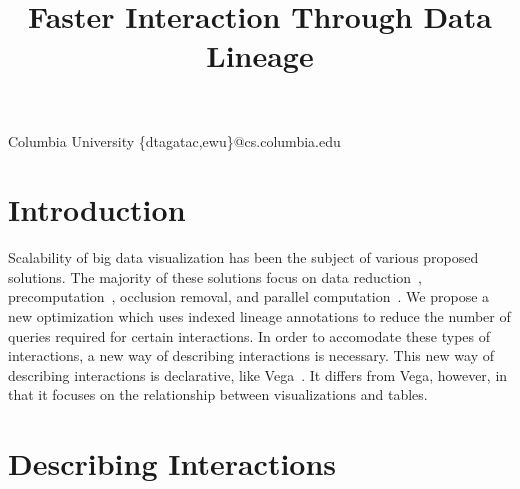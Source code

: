 \documentclass[fleqn]{sigplanconf}
\begin{document}
\setlength{\pdfpageheight}{\paperheight}
\setlength{\pdfpagewidth}{\paperwidth}


\title{Faster Interaction Through Data Lineage}

           {Columbia University}
           {\{dtagatac,ewu\}@cs.columbia.edu}

\maketitle



\section{Introduction}
Scalability of big data visualization has been the subject of various proposed solutions.
The majority of these solutions focus on data reduction~\cite{Liu2013}, precomputation~\cite{Liu2013}, occlusion removal, and parallel computation~\cite{Liu2013}.
We propose a new optimization which uses indexed lineage annotations to reduce the number of queries required for certain interactions.
In order to accomodate these types of interactions, a new way of describing interactions is necessary.
This new way of describing interactions is declarative, like Vega~\cite{Satyanarayan}.
It differs from Vega, however, in that it focuses on the relationship between visualizations and tables.

\section{Describing Interactions}
\end{document}
